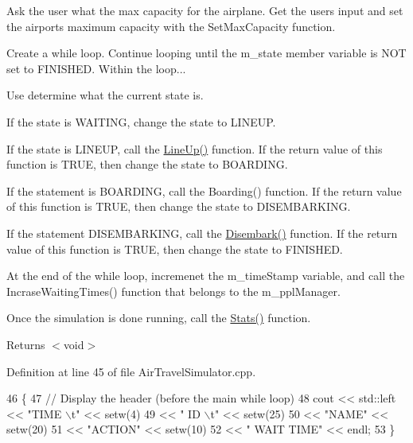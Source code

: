 \begin{DoxyEnumerate}
\item Ask the user what the max capacity for the airplane. Get the user\textquotesingle{}s input and set the airport\textquotesingle{}s maximum capacity with the Set\+Max\+Capacity function.
\item Create a while loop. Continue looping until the m\+\_\+state member variable is N\+OT set to F\+I\+N\+I\+S\+H\+ED. Within the loop...
\begin{DoxyEnumerate}
\item Use determine what the current state is.
\begin{DoxyEnumerate}
\item If the state is W\+A\+I\+T\+I\+NG, change the state to L\+I\+N\+E\+UP.
\item If the state is L\+I\+N\+E\+UP, call the \hyperlink{classAirTravelSimulator_a1fd8d540a708615996068b91d810fbd2}{Line\+Up()} function. If the return value of this function is T\+R\+UE, then change the state to B\+O\+A\+R\+D\+I\+NG.
\item If the statement is B\+O\+A\+R\+D\+I\+NG, call the Boarding() function. If the return value of this function is T\+R\+UE, then change the state to D\+I\+S\+E\+M\+B\+A\+R\+K\+I\+NG.
\item If the statement D\+I\+S\+E\+M\+B\+A\+R\+K\+I\+NG, call the \hyperlink{classAirTravelSimulator_a3714d744cdebd72838e3899f35efd513}{Disembark()} function. If the return value of this function is T\+R\+UE, then change the state to F\+I\+N\+I\+S\+H\+ED.
\end{DoxyEnumerate}
\item At the end of the while loop, incremenet the m\+\_\+time\+Stamp variable, and call the Incrase\+Waiting\+Times() function that belongs to the m\+\_\+ppl\+Manager.
\end{DoxyEnumerate}
\item Once the simulation is done running, call the \hyperlink{classAirTravelSimulator_a9c7d6726a587c06ef85cb174fa1e52b1}{Stats()} function.
\end{DoxyEnumerate}

\begin{DoxyReturn}{Returns}
$<$void$>$ 
\end{DoxyReturn}


Definition at line 45 of file Air\+Travel\+Simulator.\+cpp.


\begin{DoxyCode}
46 \{
47     \textcolor{comment}{// Display the header (before the main while loop)}
48     cout << std::left << \textcolor{stringliteral}{"TIME \(\backslash\)t"} << setw(4)
49         << \textcolor{stringliteral}{" ID \(\backslash\)t"} << setw(25)
50         << \textcolor{stringliteral}{"NAME"} << setw(20)
51         << \textcolor{stringliteral}{"ACTION"} << setw(10)
52         << \textcolor{stringliteral}{" WAIT TIME"} << endl;
53 \}
\end{DoxyCode}
